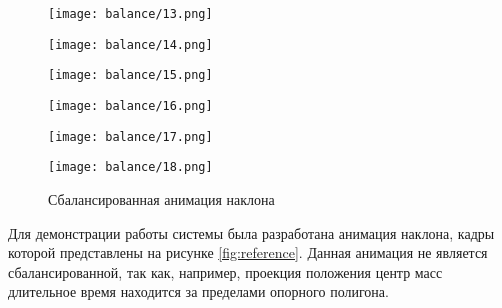 \begin{figure}
\begin{minipage}{0.325\textwidth}
    \centering
    \texttt{[image: balance/13.png]}
  \end{minipage}
  \begin{minipage}{0.325\textwidth}
    \centering
    \texttt{[image: balance/14.png]}
  \end{minipage}
  \begin{minipage}{0.325\textwidth}
    \centering
    \texttt{[image: balance/15.png]}
  \end{minipage}
  \vfill
  \hfill
  \begin{minipage}{0.325\textwidth}
    \centering
    \texttt{[image: balance/16.png]}
  \end{minipage}
  \begin{minipage}{0.325\textwidth}
    \centering
    \texttt{[image: balance/17.png]}
  \end{minipage}
  \begin{minipage}{0.325\textwidth}
    \centering
    \texttt{[image: balance/18.png]}
  \end{minipage}
  \caption{Сбалансированная анимация наклона}
  \label{fig:result}
\end{figure}

Для демонстрации работы системы была разработана анимация наклона, кадры которой представлены на рисунке \ref{fig:reference}. Данная анимация не является сбалансированной, так как, например, проекция положения центр масс длительное время находится за пределами опорного полигона.



